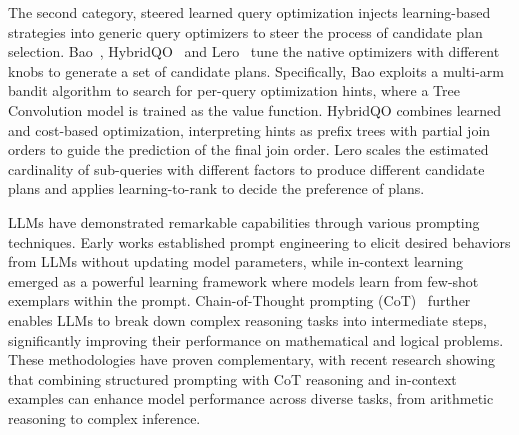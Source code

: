 The second category, steered learned query optimization injects learning-based strategies into generic query optimizers to steer the process of candidate plan selection.
Bao~\cite{DBLP:conf/sigmod/MarcusNMTAK21}, HybridQO~\cite{DBLP:journals/pvldb/YuC0L22} and Lero~\cite{DBLP:journals/pvldb/ZhuCDCPWZ23} tune the native  optimizers with different knobs to generate a set of candidate plans. 
Specifically, Bao exploits a multi-arm bandit algorithm to search for per-query optimization hints, where a Tree Convolution model is trained as the value function. 
HybridQO combines learned and cost-based optimization, interpreting hints as prefix trees with partial join orders to guide the prediction of the final join order. 
Lero scales the estimated cardinality of sub-queries with different factors to produce different candidate
plans and applies learning-to-rank to decide the preference of plans.



LLMs have demonstrated remarkable capabilities through various prompting techniques. Early works established prompt engineering to elicit desired behaviors from LLMs without updating model parameters, while in-context learning~~\cite{DBLP:conf/emnlp/MinLHALHZ22} emerged as a powerful learning framework where models learn from few-shot exemplars within the prompt. 
Chain-of-Thought prompting (CoT)~\cite{DBLP:conf/nips/KojimaGRMI22} further enables LLMs to break down complex reasoning tasks into intermediate steps, significantly improving their performance on mathematical and logical problems. These methodologies have proven complementary, with recent research showing that combining structured prompting with CoT reasoning and in-context examples can enhance model performance across diverse tasks, from arithmetic reasoning to complex inference.

